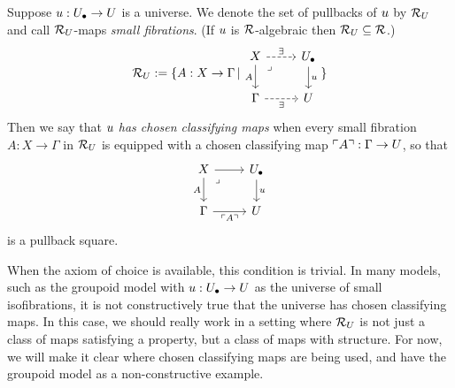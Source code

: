 \begin{definition}\label{def:alg-universe-classifying-map}
  Suppose ${u} : {U_\bullet} \to U$ is a universe.
  We denote the set of pullbacks of ${u}$ by $\mathcal{R}_U$
  and call $\mathcal{R}_U$-maps \emph{small fibrations}.
  (If ${u}$ is $\mathcal{R}$-algebraic then $\mathcal{R}_U \subseteq \mathcal{R}$.)
  \[
    \RR_\U := \{ A : X \to \Gamma \st \begin{tikzcd}
    X & \Ulow \\
    \Gamma & \U
    \arrow["\exists", dashed, from=1-1, to=1-2]
    \arrow["A"', from=1-1, to=2-1]
    \arrow["\lrcorner"{anchor=center, pos=0.125}, draw=none, from=1-1, to=2-2]
    \arrow["\uu", from=1-2, to=2-2]
    \arrow["\exists"', dashed, from=2-1, to=2-2]
  \end{tikzcd}\}
  \]
  Then we say that ${u}$ \emph{has chosen classifying maps}
  when every small fibration $A : X \to \Gamma$ in $\mathcal{R}_U$
  is equipped with a {chosen classifying map}
  $\ulcorner A \urcorner : \Gamma \to U$,
  so that
  \[ \begin{tikzcd}
    X & \Ulow \\
    \Gamma & \U
    \arrow[from=1-1, to=1-2]
    \arrow["A"', from=1-1, to=2-1]
    \arrow["\lrcorner"{anchor=center, pos=0.125}, draw=none, from=1-1, to=2-2]
    \arrow["\uu", from=1-2, to=2-2]
    \arrow["{{\ulcorner A \urcorner}}"', from=2-1, to=2-2]
  \end{tikzcd} \]
  is a pullback square.
\end{definition}
When the axiom of choice is available,
this condition is trivial.
In many models, such as the groupoid model with ${u} : {U_\bullet} \to U$
as the universe of small isofibrations,
it is not constructively true that the universe has chosen classifying maps.
In this case, we should really work in a setting where $\mathcal{R}_U$
is not just a class of maps satisfying a property,
but a class of maps with structure.
For now, we will make it clear where chosen classifying maps are being used,
and have the groupoid model as a non-constructive example.

